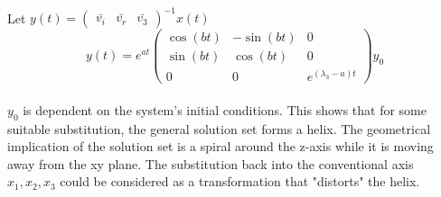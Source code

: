 \\Let $\displaystyle{y(t) = \begin{pmatrix} \bar{v_i}&\bar{v_r} &\bar{v_3} \end{pmatrix} ^{-1 }x(t)}$
$$y(t) = e^{at} \begin{pmatrix}\cos{(bt)} &-\sin{(bt)} &0\\\sin{(bt)}&\cos{(bt)} & 0\\0& 0& e^{(\lambda_3 - a)t}\end{pmatrix} y_0$$
\\$y_0$ is dependent on the system's initial conditions. This shows that for some suitable substitution, the general solution set forms a helix. The geometrical implication of the solution set is a spiral around the z-axis while it is moving away from the xy plane. The substitution back into the conventional axis $x_1,x_2,x_3$ could be considered as a transformation that "distorts" the helix. 
